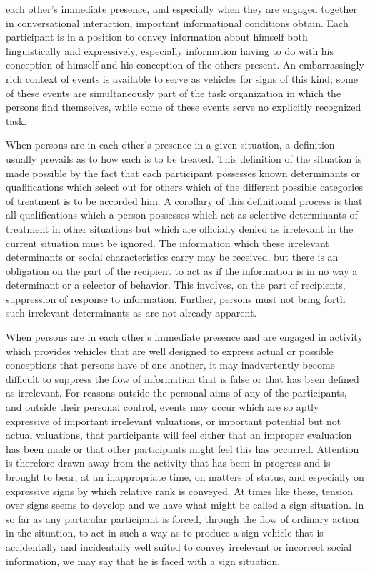 \documentclass[twoside,symmetric,nobib,justified]{tufte-book}
\begin{document}
 each other's immediate presence, and especially when
they are engaged together in conversational interaction, important
informational conditions obtain. Each participant is in a position to
convey information about himself both linguistically and expressively,
especially information having to do with his conception of himself and
his conception of the others present. An embarrassingly rich context of
events is available to serve as vehicles for signs of this kind; some of
these events are simultaneously part of the task organization in which
the persons find themselves, while some of these events serve no
explicitly recognized task.

When persons are in each other's presence in a given situation, a
definition usually prevails as to how each is to be treated. This
definition of the situation is made possible by the fact that each
participant possesses known determinants or qualifications which select
out for others which of the different possible categories of treatment
is to be accorded him. A corollary of this definitional process is that
all qualifications which a person possesses which act as selective
determinants of treatment in other situations but which are officially
denied as irrelevant in the current situation must be ignored. The
information which these irrelevant determinants or social
characteristics carry may be received, but there is an obligation on the
part of the recipient to act as if the information is in no way a
determinant or a selector of behavior. This involves, on the part of
recipients, suppression of response to information. Further, persons
must not bring forth such irrelevant determinants as are not already
apparent.

When persons are in each other's immediate presence and are engaged in
activity which provides vehicles that are well designed to express
actual or possible conceptions that persons have of one another, it may
inadvertently become difficult to suppress the flow of information that
is false or that has been defined as irrelevant. For reasons outside the
personal aims of any of the participants, and outside their personal
control, events may occur which are so aptly expressive of important
irrelevant valuations, or important potential but not actual valuations,
that participants will feel either that an improper evaluation has been
made or that other participants might feel this has occurred. Attention
is therefore drawn away from the activity that has been in progress and
is brought to bear, at an inappropriate time, on matters of status, and
especially on expressive signs by which relative rank is conveyed. At
times like these, tension over signs seems to develop and we have what
might be called a sign situation. In so far as any particular
participant is forced, through the flow of ordinary action in the
situation, to act in such a way as to produce a sign vehicle that is
accidentally and incidentally well suited to convey irrelevant or
incorrect social information, we may say that he is faced with a sign
situation.
\end{document}

